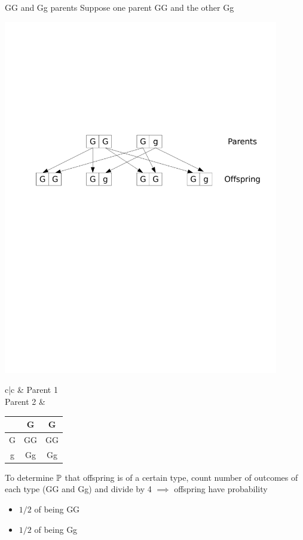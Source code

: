 \documentclass[aspectratio=169]{beamer}
\begin{document}
\begin{frame}{GG and Gg parents}
Suppose one parent GG and the other Gg
\vfill
\begin{center}
	\includegraphics[width=0.9\textwidth]{FIGS_slides/dominant_hybrid}
\end{center}
\begin{center}
\begin{tabular}{c|c}
& Parent 1 \\ 
\hline
Parent 2 &
\begin{tabular}{c|cc}
& G & G \\
\hline
G & GG & GG \\
g & Gg & Gg
\end{tabular}
\end{tabular}
\end{center}
To determine $\mathbb{P}$ that offspring is of a certain type, count number of outcomes of each type (GG and Gg) and divide by 4
\vfill
$\implies$ offspring have probability
\begin{itemize}
\item $1/2$ of being GG
\item $1/2$ of being Gg
\end{itemize}
\end{frame}
\end{document}
